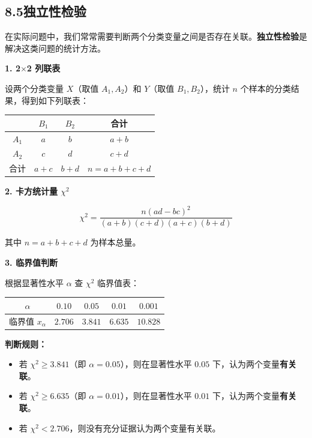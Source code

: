\documentclass[12pt, a4paper]{ctexart}
\begin{document}
\subsection*{8.5\quad 独立性检验}

\begin{knowledgebox}
在实际问题中，我们常常需要判断两个分类变量之间是否存在关联。\textbf{独立性检验}是解决这类问题的统计方法。

\medskip
\textbf{1. 2$\times$2 列联表}

设两个分类变量 $X$（取值 $A_1, A_2$）和 $Y$（取值 $B_1, B_2$），统计 $n$ 个样本的分类结果，得到如下列联表：

\begin{center}
\begin{tabular}{c|cc|c}
\toprule
 & $B_1$ & $B_2$ & 合计 \\
\midrule
$A_1$ & $a$ & $b$ & $a+b$ \\
$A_2$ & $c$ & $d$ & $c+d$ \\
\midrule
合计 & $a+c$ & $b+d$ & $n = a+b+c+d$ \\
\bottomrule
\end{tabular}
\end{center}

\medskip
\textbf{2. 卡方统计量 $\chi^2$}

\[
\boxed{\chi^2 = \frac{n(ad - bc)^2}{(a+b)(c+d)(a+c)(b+d)}}
\]

其中 $n = a + b + c + d$ 为样本总量。

\medskip
\textbf{3. 临界值判断}

根据显著性水平 $\alpha$ 查 $\chi^2$ 临界值表：
\begin{center}
\begin{tabular}{ccccc}
\toprule
$\alpha$ & $0.10$ & $0.05$ & $0.01$ & $0.001$ \\
\midrule
临界值 $x_\alpha$ & $2.706$ & $3.841$ & $6.635$ & $10.828$ \\
\bottomrule
\end{tabular}
\end{center}

\medskip
\textbf{判断规则：}
\begin{itemize}[leftmargin=2em]
  \item 若 $\chi^2 \geqslant 3.841$（即 $\alpha = 0.05$），则在显著性水平 $0.05$ 下，认为两个变量\textbf{有关联}。
  \item 若 $\chi^2 \geqslant 6.635$（即 $\alpha = 0.01$），则在显著性水平 $0.01$ 下，认为两个变量\textbf{有关联}。
  \item 若 $\chi^2 < 2.706$，则没有充分证据认为两个变量有关联。
\end{itemize}
\end{knowledgebox}
\end{document}
